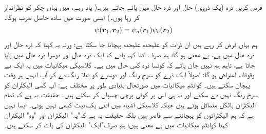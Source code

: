 فرض کریں ذرہ   (یک ذروی)  حال   اور ذرہ    حال  میں پائے جاتے ہیں۔( یاد رہے،   میں یہاں چکر کو نظرانداز کر رہا ہوں۔)  ایسی صورت میں  سادہ حاصل ضرب ہوگا۔
\begin{align}
	\psi({{\boldsymbol{r}}}_1, {{\boldsymbol{r}}}_2)=\psi_a({{\boldsymbol{r}}}_1)\psi_b({{\boldsymbol{r}}}_2)
\end{align}
 ہم یہاں  فرض کر رہے ہیں  ان ذرات کو علیحدہ علیحدہ پہچانا جا  سکتا ہے؛  ورنہ یہ کہنا کہ ذرہ  حال   اور ذرہ  حال  میں ہے،  بے معنی ہو  گا؛   ہم  صرف اتنا کہہ پاتے کہ ایک ذرہ  حال   اور دوسرا ذرہ  حال  میں پایا جاتا ہے، تاہم ہم نہیں جان پاتے کہ کونسا ذرہ کس حال میں ہے۔ کلاسیکی میکانیات میں یہ ایک بے وقوفانہ  اعتراض ہو گا: اصولاً ایک ذرے کو سرخ رنگ اور دوسرے کو نیلا رنگ دے کر آپ انہیں ہر وقت پہچان سکتے ہیں۔ کوانٹم میکانیات میں صورتحال بنیادی طور پر مختلف ہے:  آپ کسی الیکٹران کو سرخ رنگ نہیں دے سکتے  اور نہ ہی اس پر کوئی پرچی چسپاں کر سکتے ہیں۔ حقیقت یہ ہے کہ تمام الیکٹران بالکل متماثل ہوتے ہیں جبکہ کلاسیکی اشیاء میں اتنی یکسانیت کبھی نہیں ہوتی۔ ایسا نہیں ہے کہ ہم الیکٹرانوں کو پہچاننے سے قاصر ہیں بلکہ حقیقت یہ ہے کہ"یہ" الیکٹران اور "وہ"   الیکٹران   کہنا کوانٹم میکانیات میں بے معنی ہیں؛   ہم صرف"ایک" الیکٹران کی بات کر سکتے ہیں۔
 
